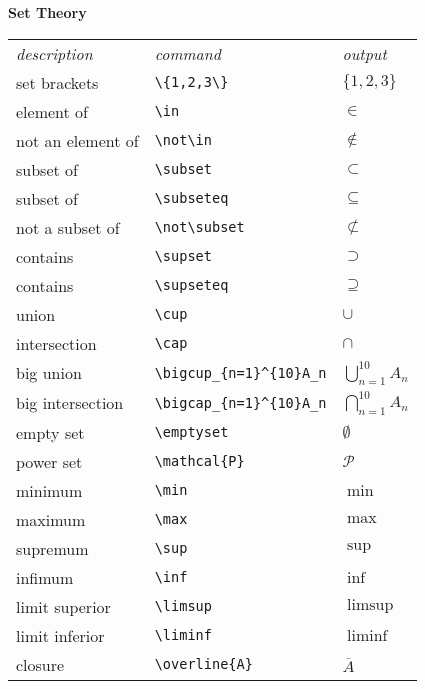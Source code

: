 \documentclass[10pt,landscape]{article}
\newcommand{\ColorSubsection}[1]{\par\vspace{1ex}\noindent\textcolor{subsectioncolor}{\normalsize\bfseries #1}\par\vspace{0.5ex}}
\begin{document}
\begin{multicols}{3}
\ColorSubsection{Set Theory}
\begin{tabular}{lll}
\emph{description} & \emph{command} & \emph{output}\\
set brackets & \verb!\{1,2,3\}! & $\{1,2,3\}$\\
element of & \verb!\in! & $\in$\\
not an element of & \verb!\not\in! & $\not\in$\\
subset of & \verb!\subset! & $\subset$\\
subset of & \verb!\subseteq! & $\subseteq$\\
not a subset of & \verb!\not\subset! & $\not\subset$\\
contains & \verb!\supset! & $\supset$\\
contains & \verb!\supseteq! & $\supseteq$\\
union & \verb!\cup! & $\cup$\\
intersection & \verb!\cap! & $\cap$\\
big union & 
\verb!\bigcup_{n=1}^{10}A_n! &
$\displaystyle \bigcup_{n=1}^{10}A_{n}$\\
big intersection & \verb!\bigcap_{n=1}^{10}A_n! &$\displaystyle \bigcap_{n=1}^{10}A_{n}$\\
empty set & \verb!\emptyset! & $\emptyset$\\
power set & \verb!\mathcal{P}! & $\mathcal{P}$\\
minimum & \verb!\min! & $\min$\\
maximum & \verb!\max! & $\max$\\
supremum & \verb!\sup! & $\sup$\\
infimum & \verb!\inf! & $\inf$\\
limit superior & \verb!\limsup! & $\limsup$\\
limit inferior & \verb!\liminf! & $\liminf$\\
closure & \verb!\overline{A}! & $\overline{A}$
\end{tabular}


\end{multicols}
\end{document}
